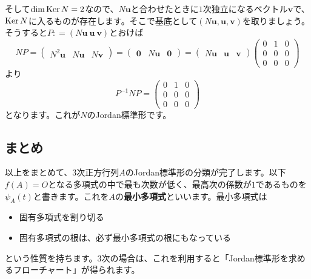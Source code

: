 そして$\dim \operatorname{Ker} N = 2$なので、$N\bm{u}$と合わせたときに$1$次独立になるベクトル$\bm{v}$で、$\operatorname{Ker} N$に入るものが存在します。そこで基底として$(N\bm{u}, \bm{u}, \bm{v})$を取りましょう。そうすると$P: = (N\bm{u}\ \bm{u}\ \bm{v})$とおけば
\[
NP =
\begin{pmatrix}
N^2\bm{u} & N\bm{u} & N\bm{v}
\end{pmatrix}
=
\begin{pmatrix}
\bm{0} & N\bm{u} & \bm{0}
\end{pmatrix}
=
\begin{pmatrix}
N\bm{u} & \bm{u} & \bm{v}
\end{pmatrix}
\begin{pmatrix}
0 & 1 & 0 \\
0 & 0 & 0 \\
0 & 0 & 0
\end{pmatrix}
\]
より
\[
P^{-1} N P =
\begin{pmatrix}
0 & 1 & 0 \\
0 & 0 & 0 \\
0 & 0 & 0
\end{pmatrix}
\]
となります。これが$N$のJordan標準形です。

\subsection{まとめ}

以上をまとめて、$3$次正方行列$A$のJordan標準形の分類が完了します。以下$f(A) = O$となる多項式の中で最も次数が低く、最高次の係数が$1$であるものを$\psi_A(t)$と書きます。これを$A$の\textbf{最小多項式}といいます。最小多項式は
\begin{itemize}
\item 固有多項式を割り切る
\item 固有多項式の根は、必ず最小多項式の根にもなっている
\end{itemize}
という性質を持ちます。$3$次の場合は、これを利用すると「Jordan標準形を求めるフローチャート」が得られます。


